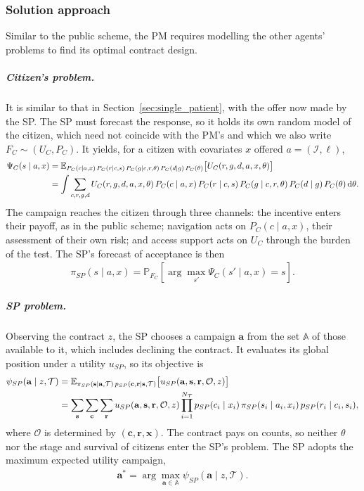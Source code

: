 \documentclass[12pt]{article}
\begin{document}
\subsubsection{Solution approach}\label{sec:OBP_inc}
Similar to the public scheme, the PM requires modelling the other agents' problems to find its optimal contract design. 
\subparagraph{Citizen's problem.}
It is similar to that in Section~\ref{sec:single_patient}, with the offer now
made by the SP. The SP must forecast the response, so it holds its own random model of the
citizen, which need not coincide with the PM's and which we also write
$F_C \sim (U_C, P_C)$. It yields, for a citizen with covariates $x$ offered
$a = (\mathcal{I}, \ell)$,
\begin{align} \label{eq:psi_C}
    \Psi_C(s \mid a, x)
    &= \mathbb{E}_{P_C(c \mid a, x)\, P_C(r \mid c, s)\,
        P_C(g \mid c, r, \theta)\, P_C(d \mid g)\, P_C(\theta)}
       \big[ U_C( r, g, d, a, x, \theta ) \big]  \\
    &= \int \sum_{c,r,g,d}
       U_C( r, g, d, a, x, \theta )\,
       P_C(c \mid a, x)\, P_C(r \mid c, s)\,
       P_C(g \mid c, r, \theta)\, P_C(d \mid g)\, P_C(\theta) \,
       \mathrm{d}\theta. \notag
\end{align}
The campaign reaches the citizen through three channels: the incentive enters
their payoff, as in the public scheme; navigation acts on $P_C(c \mid a, x)$,
their assessment of their own risk; and access support acts on $U_C$ through
the burden of the test. The SP's forecast of acceptance is then
\begin{align} \label{eq:p_s}
    \pi_{SP}(s \mid a, x) = \mathbb{P}_{F_C}\!\left[
    \arg\max_{s'} \Psi_C(s' \mid a, x) = s \right].
\end{align}

\subparagraph{SP problem.}
Observing the contract $z$, the SP chooses a campaign $\mathbf{a}$ from the set
$\mathbb{A}$ of those available to it, which includes declining the contract.
It evaluates its global position under a utility $u_{SP}$, so its objective is
\begin{align}\label{eq:sp_util}
  \psi_{SP}(\mathbf{a} \mid z, \mathcal{T})
  &= \mathbb{E}_{\pi_{SP}(\mathbf{s} \mid \mathbf{a}, \mathcal{T})\,
     p_{SP}(\mathbf{c}, \mathbf{r} \mid \mathbf{s}, \mathcal{T})}
     \big[ u_{SP}( \mathbf{a}, \mathbf{s}, \mathbf{r}, \mathcal{O}, z ) \big] \\
  &= \sum_{\mathbf{s}} \sum_{\mathbf{c}} \sum_{\mathbf{r}}
    u_{SP}( \mathbf{a}, \mathbf{s}, \mathbf{r}, \mathcal{O}, z )
    \prod_{i = 1}^{N_{\mathcal{T}}}
      p_{SP}(c_i \mid x_i)\, \pi_{SP}(s_i \mid a_i, x_i)\,
      p_{SP}(r_i \mid c_i, s_i), \notag
\end{align}
where $\mathcal{O}$ is determined by $(\mathbf{c}, \mathbf{r}, \mathbf{x})$.
The contract pays on counts, so neither $\theta$ nor the stage and survival of
citizens enter the SP's problem. The SP adopts the maximum expected
utility campaign,
\begin{align}\label{eq:sp_argmax}
  \mathbf{a}^{*} = \arg\max_{\mathbf{a} \in \mathbb{A}}
    \psi_{SP}(\mathbf{a} \mid z, \mathcal{T}).
\end{align}
\end{document}
